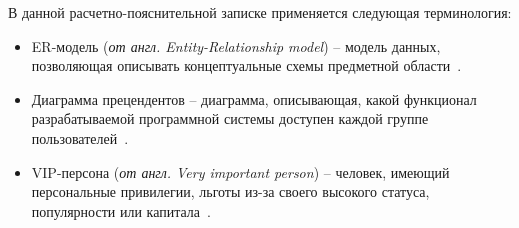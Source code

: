
В данной расчетно-пояснительной записке применяется следующая терминология:
\begin{itemize}[label=]
	\item ER-модель (\textit{от англ. Entity-Relationship model}) -- модель данных, позволяющая описывать концептуальные схемы предметной области~\cite{lit5}.
	\item Диаграмма прецендентов -- диаграмма, описывающая, какой функционал разрабатываемой программной системы доступен каждой группе пользователей~\cite{lit9}.
	\item VIP-персона (\textit{от англ. Very important person}) -- человек, имеющий персональные привилегии, льготы из-за своего высокого статуса, популярности или капитала~\cite{lit6}. 
\end{itemize}

\clearpage
